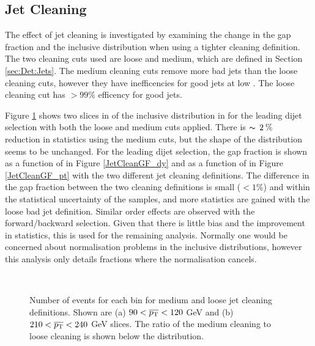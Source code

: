 \subsection{Jet Cleaning}
\label{sec:GBJ1:Cleaning}

The effect of jet cleaning is investigated by examining the change in the gap fraction and the inclusive distribution when using a tighter cleaning definition. 
The two cleaning cuts used are loose and medium, which are defined in Section \ref{sec:Det:Jets}.
The medium cleaning cuts remove more bad jets than the loose cleaning cuts, however they have inefficencies for good jets at low \pt{}.
The loose cleaning cut has $>99\%$ efficency for good jets.

Figure \ref{JetCleanIncl_dy} shows two slices in \ptb{} of the inclusive distribution in \dy{} for the leading \pt{} dijet selection with both the loose and medium cuts applied. 
There is $\thicksim\, 2\: \%\: $ reduction in statistics using the medium cuts, but the shape of the distribution seems to be unchanged.  
For the leading \pt{} dijet selection, the gap fraction is shown as a function of \ptb{} in Figure \ref{JetCleanGF_dy} and as a function of \dy{} in Figure \ref{JetCleanGF_pt} with the two different jet cleaning definitions. 
The difference in the gap fraction between the two cleaning definitions is small ($<1\%$) and within the statistical uncertainty of the samples, and more statistics are gained with the loose bad jet definition.
Similar order effects are observed with the forward/backward selection.
Given that there is little bias and the improvement in statistics, this is used for the remaining analysis. 
Normally one would be concerned about normalisation problems in the inclusive distributions, however this analysis only details fractions where the normalisation cancels.


\begin{figure}
\centering
\mbox{
              \quad
              \quad
                              }
\caption[Effect of jet cleaning on the inclusive distribution in \dy{}]{
Number of events for each \dy{} bin for medium and loose jet cleaning definitions. 
Shown are (a) $90<\mbox{$\overline{p_{\rm T}}$}{}<120$ GeV and (b)$210<\mbox{$\overline{p_{\rm T}}$}{}<240$ GeV slices.
The ratio of the medium cleaning to loose cleaning is shown below the distribution.
\label{JetCleanIncl_dy}}
\end{figure}

